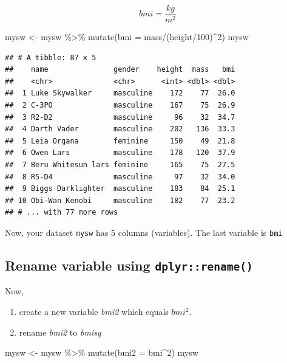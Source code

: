 \documentclass[
]{book}
\makeatletter
\newenvironment{Shaded}{\begin{snugshade}}{\end{snugshade}}
\newcommand{\AttributeTok}[1]{\textcolor[rgb]{0.61,0.61,0.61}{#1}}
\newcommand{\DecValTok}[1]{\textcolor[rgb]{0.06,0.06,0.06}{#1}}
\newcommand{\FunctionTok}[1]{\textcolor[rgb]{0,0,0}{#1}}
\newcommand{\NormalTok}[1]{#1}
\newcommand{\OtherTok}[1]{\textcolor[rgb]{0.37,0.37,0.37}{#1}}
\newcommand{\SpecialCharTok}[1]{\textcolor[rgb]{0,0,0}{#1}}
\providecommand{\tightlist}{%
  \setlength{\itemsep}{0pt}\setlength{\parskip}{0pt}}
\newenvironment{kframe}{%
\medskip{}
\setlength{\fboxsep}{.8em}
 \def\at@end@of@kframe{}%
 \ifinner\ifhmode%
  \def\at@end@of@kframe{\end{minipage}}%
  \begin{minipage}{\columnwidth}%
 \fi\fi%
 \def\FrameCommand##1{\hskip\@totalleftmargin \hskip-\fboxsep
 \colorbox{shadecolor}{##1}\hskip-\fboxsep
     \hskip-\linewidth \hskip-\@totalleftmargin \hskip\columnwidth}%
 \MakeFramed {\advance\hsize-\width
   \@totalleftmargin\z@ \linewidth\hsize
   \@setminipage}}%
 {\par\unskip\endMakeFramed%
 \at@end@of@kframe}
\renewenvironment{Shaded}{\begin{kframe}}{\end{kframe}}
\makeatother
\begin{document}
\[bmi = \frac{kg}{m^2}\]

\begin{Shaded}
\begin{Highlighting}[]
\NormalTok{mysw }\OtherTok{\textless{}{-}}\NormalTok{ mysw }\SpecialCharTok{\%\textgreater{}\%} \FunctionTok{mutate}\NormalTok{(}\AttributeTok{bmi =}\NormalTok{ mass}\SpecialCharTok{/}\NormalTok{(height}\SpecialCharTok{/}\DecValTok{100}\NormalTok{)}\SpecialCharTok{\^{}}\DecValTok{2}\NormalTok{)}
\NormalTok{mysw}
\end{Highlighting}
\end{Shaded}

\begin{verbatim}
## # A tibble: 87 x 5
##    name               gender    height  mass   bmi
##    <chr>              <chr>      <int> <dbl> <dbl>
##  1 Luke Skywalker     masculine    172    77  26.0
##  2 C-3PO              masculine    167    75  26.9
##  3 R2-D2              masculine     96    32  34.7
##  4 Darth Vader        masculine    202   136  33.3
##  5 Leia Organa        feminine     150    49  21.8
##  6 Owen Lars          masculine    178   120  37.9
##  7 Beru Whitesun lars feminine     165    75  27.5
##  8 R5-D4              masculine     97    32  34.0
##  9 Biggs Darklighter  masculine    183    84  25.1
## 10 Obi-Wan Kenobi     masculine    182    77  23.2
## # ... with 77 more rows
\end{verbatim}

Now, your dataset \texttt{mysw} has 5 columns (variables). The last variable is \texttt{bmi}

\hypertarget{rename-variable-using-dplyrrename}{%
\subsection{\texorpdfstring{Rename variable using \texttt{dplyr::rename()}}{Rename variable using dplyr::rename()}}\label{rename-variable-using-dplyrrename}}

Now,

\begin{enumerate}
\def\labelenumi{\arabic{enumi}.}
\tightlist
\item
  create a new variable \emph{bmi2} which equals \(bmi^2\).
\item
  rename \emph{bmi2} to \emph{bmisq}
\end{enumerate}

\begin{Shaded}
\begin{Highlighting}[]
\NormalTok{mysw }\OtherTok{\textless{}{-}}\NormalTok{ mysw }\SpecialCharTok{\%\textgreater{}\%} \FunctionTok{mutate}\NormalTok{(}\AttributeTok{bmi2 =}\NormalTok{ bmi}\SpecialCharTok{\^{}}\DecValTok{2}\NormalTok{)}
\NormalTok{mysw}
\end{Highlighting}
\end{Shaded}
\end{document}
